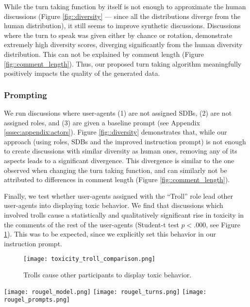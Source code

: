 While the turn taking function by itself is not enough to approximate the human discussions (Figure \ref{fig::diversity} — since all the distributions diverge from the human distribution), it still seems to improve synthetic discussions. Discussions where the turn to speak was given either by chance or rotation, demonstrate extremely high diversity scores, diverging significantly from the human diversity distribution. This can not be explained by comment length (Figure \ref{fig::comment_length}). Thus, our proposed turn taking algorithm meaningfully positively impacts the quality of the generated data.


\subsubsection{Prompting}

We run discussions where user-agents (1) are not assigned \acp{SDB}, (2) are not assigned roles, and (3) are given a baseline prompt (see Appendix \ref{sssec:appendix:actors}). Figure \ref{fig::diversity} demonstrates that, while our approach (using roles, \acp{SDB} and the improved instruction prompt) is not enough to create discussions with similar diversity as human ones, removing any of its aspects leads to a significant divergence. This divergence is similar to the one observed when changing the turn taking function, and can similarly not be attributed to differences in comment length (Figure \ref{fig::comment_length}).

Finally, we test whether user-agents assigned with the “Troll” role lead other user-agents into displaying toxic behavior. We find that discussions which involved trolls cause a statistically and qualitatively significant rise in toxicity in the comments of the rest of the user-agents (Student-t test $p<.000$, see Figure \ref{fig::goad}). This was to be expected, since we explicitly set this behavior in our instruction prompt.

\begin{figure}
    \texttt{[image: toxicity\_troll\_comparison.png]} 
	\caption{Trolls cause other participants to display toxic behavior.}
	\label{fig::goad}
\end{figure}

\begin{figure*}[t]
    \texttt{[image: rougel\_model.png]} \hfill
    \texttt{[image: rougel\_turns.png]}
    \hfill
    \texttt{[image: rougel\_prompts.png]}
	\centering
	\caption{Diversity (Section \ref{ssec:methodology:diversity}) distribution for each discussion by model (Section \ref{ssec:experimental:model}), turn-taking function $u$ (Section \ref{ssec:experimental:turn}), and prompting function $\phi$ used (Section \ref{ssec:experimental:prompts}).}
	\label{fig::diversity}
\end{figure*}

